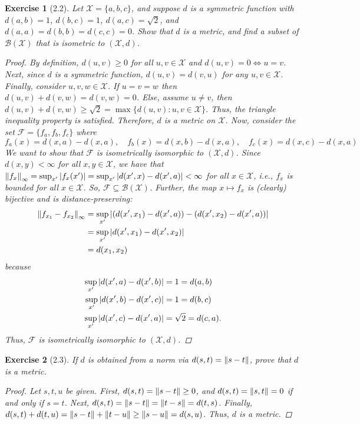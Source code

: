 \documentclass[11pt]{article}
\newtheorem{exercise}{Exercise}
\begin{document}
\begin{exercise}[2.2]
	Let $\mathcal{X} = \{a,b,c \}$, and suppose $d$ is a symmetric function with $d(a,b)=1$, $d(b,c) = 1$, $d(a,c) = \sqrt{2}$, and $d(a,a) = d(b,b) = d(c,c) = 0$. Show that $d$ is a metric, and find a subset of $\mathcal{B}(\mathcal{X})$ that is isometric to $(\mathcal{X},d)$. 
	
	\begin{proof}
	By definition, $d(u,v) \geq 0$ for all $u,v\in \mathcal{X}$ and $d(u,v) = 0 \iff u=v$. Next, since $d$ is a symmetric function, $d(u,v) = d(v,u)$ for any $u,v\in \mathcal{X}$. Finally, consider $u,v,w\in \mathcal{X}$. If $u=v=w$ then $d(u,v) + d(v,w) = d(v,w) = 0$. Else, assume $u\neq v$, then $d(u,v) + d(v,w) \geq \sqrt{2} = \max\{ d(u,v) : u,v\in \mathcal{X} \}$. Thus, the triangle inequality property is satisfied. Therefore, $d$ is a metric on $\mathcal{X}$. Now, consider the set $\mathcal{F} = \{f_a, f_b, f_c\}$ where 
	\begin{equation*}
	f_a(x) = d(x,a) - d(x,a), \quad f_b(x) = d(x,b) - d(x,a) ,\quad f_c(x) = d(x,c) - d(x,a) 
	\end{equation*}
	We want to show that $\mathcal{F}$ is isometrically isomorphic to $(\mathcal{X},d)$. Since $d(x,y) < \infty$ for all $x,y\in \mathcal{X}$, we have that $\norm{f_x}_\infty = \sup_{x'}\abs{f_x(x')} = \sup_{x'}\abs{d(x',x) - d(x',a)}< \infty$ for all $x\in \mathcal{X}$, i.e., $f_x$ is bounded for all $x\in \mathcal{X}$. So, $\mathcal{F} \subseteq \mathcal{B}(\mathcal{X})$. Further, the map $x\mapsto f_x$ is (clearly) bijective and is distance-preserving:
	\begin{align*}
	\norm{f_{x_1} - f_{x_2}}_\infty 
	&= \sup_{x'} \abs{(d(x',x_1) - d(x',a)) - (d(x',x_2) - d(x',a))} \\
	&= \sup_{x'} \abs{d(x',x_1) - d(x',x_2)}\\
	&= d(x_1,x_2)
	\end{align*}
	because 
	\begin{align*}
	\sup_{x'} \abs{d(x',a) - d(x',b)} &= 1 = d(a,b) \\
 	\sup_{x'} \abs{d(x',b) - d(x',c)} &= 1 = d(b,c)\\
	\sup_{x'} \abs{d(x',c) - d(x',a)} &= \sqrt{2} = d(c,a). 
	\end{align*}
	Thus, $\mathcal{F}$ is isometrically isomorphic to $(\mathcal{X},d)$. 
	\end{proof}
\end{exercise}

\begin{exercise}[2.3]
	If $d$ is obtained from a norm via $d(s,t) = \norm{s-t}$, prove that $d$ is a metric.
	
	\begin{proof}
		Let $s,t,u$ be given. First, $d(s,t) = \norm{s-t} \geq 0$, and $d(s,t) = \norm{s,t} = 0$ if and only if $s=t$. Next, $d(s,t) = \norm{s-t} = \norm{t-s} = d(t,s)$. Finally, $d(s,t) + d(t,u) = \norm{s-t} + \norm{t-u} \geq \norm{s-u} = d(s,u)$. Thus, $d$ is a metric.
	\end{proof}
\end{exercise}
\end{document}
